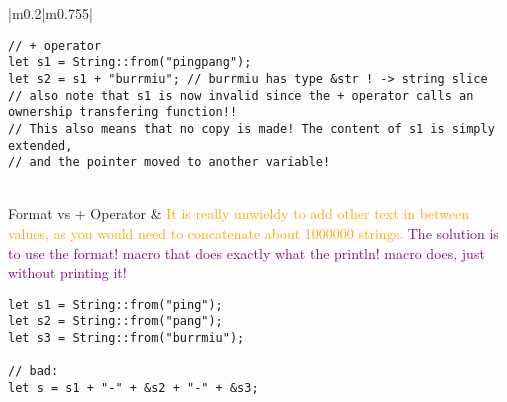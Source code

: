 \documentclass[main.tex,fontsize=8pt,paper=a4,paper=portrait,DIV=calc,]{scrartcl}
\begin{document}
\begin{table}[ht!]
\begin{tabular}{|m{0.2\linewidth}|m{0.755\linewidth}|}
\begin{lstlisting}
// + operator
let s1 = String::from("pingpang");
let s2 = s1 + "burrmiu"; // burrmiu has type &str ! -> string slice
// also note that s1 is now invalid since the + operator calls an ownership transfering function!!
// This also means that no copy is made! The content of s1 is simply extended,
// and the pointer moved to another variable!
\end{lstlisting}\\
\hline
Format vs + Operator & 
\textcolor{orange}{It is really unwieldy to add other text in between values, as you would need to concatenate about 1000000 strings.}\newline
\textcolor{purple}{The solution is to use the format! macro that does exactly what the println! macro does, just without printing it!}\newline
\begin{lstlisting}
let s1 = String::from("ping");
let s2 = String::from("pang");
let s3 = String::from("burrmiu");

// bad:
let s = s1 + "-" + &s2 + "-" + &s3;


\end{lstlisting}
\end{tabular}
\end{table}
\end{document}

